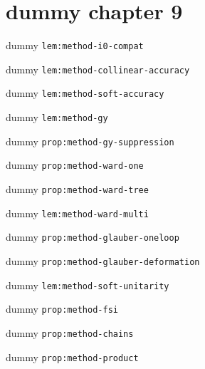 \chapter{dummy chapter 9}
\begin{lemma}\label{lem:method-i0-compat}dummy \texttt{lem:method-i0-compat}\end{lemma}
\begin{lemma}\label{lem:method-collinear-accuracy}dummy \texttt{lem:method-collinear-accuracy}\end{lemma}
\begin{lemma}\label{lem:method-soft-accuracy}dummy \texttt{lem:method-soft-accuracy}\end{lemma}
\begin{lemma}\label{lem:method-gy}dummy \texttt{lem:method-gy}\end{lemma}
\begin{proposition}\label{prop:method-gy-suppression}dummy \texttt{prop:method-gy-suppression}\end{proposition}
\begin{proposition}\label{prop:method-ward-one}dummy \texttt{prop:method-ward-one}\end{proposition}
\begin{proposition}\label{prop:method-ward-tree}dummy \texttt{prop:method-ward-tree}\end{proposition}
\begin{lemma}\label{lem:method-ward-multi}dummy \texttt{lem:method-ward-multi}\end{lemma}
\begin{proposition}\label{prop:method-glauber-oneloop}dummy \texttt{prop:method-glauber-oneloop}\end{proposition}
\begin{proposition}\label{prop:method-glauber-deformation}dummy \texttt{prop:method-glauber-deformation}\end{proposition}
\begin{lemma}\label{lem:method-soft-unitarity}dummy \texttt{lem:method-soft-unitarity}\end{lemma}
\begin{proposition}\label{prop:method-fsi}dummy \texttt{prop:method-fsi}\end{proposition}
\begin{proposition}\label{prop:method-chains}dummy \texttt{prop:method-chains}\end{proposition}
\begin{proposition}\label{prop:method-product}dummy \texttt{prop:method-product}\end{proposition}
